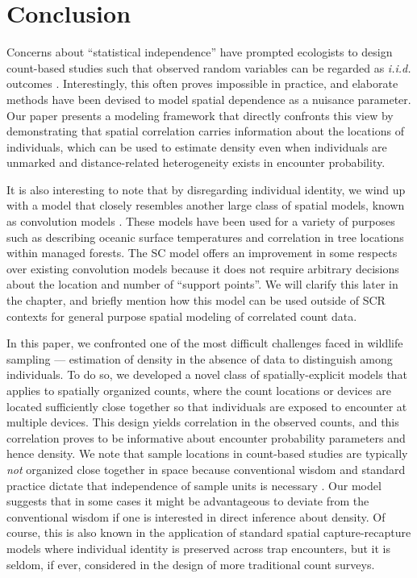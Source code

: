 \section{Conclusion}

Concerns about ``statistical independence'' have prompted
ecologists to design count-based studies such that observed
random variables can be regarded as {\it i.i.d.} outcomes
\citep{hurlbert:1984}. Interestingly, this
often proves impossible in practice, and elaborate
methods have been devised to model spatial dependence as a nuisance
parameter. Our paper presents a modeling framework that directly
confronts this view by demonstrating that spatial
correlation carries information about the locations of individuals,
which can be used to estimate density even when individuals
are unmarked and distance-related heterogeneity exists in encounter
probability.




It is also interesting to note that by disregarding individual
identity, we wind up with a model that closely resembles another large
class of spatial models, known as convolution models
\citep{wolpert_ickstadt:1998,higdon:1998}. These
models have been used for a variety of purposes such as describing oceanic
surface temperatures and correlation in tree locations within managed
forests. The SC model offers an improvement in
some respects over existing convolution models because it does not
require arbitrary decisions about the location and number of ``support
points''. We will clarify this later in the chapter, and briefly
mention how this model can be used outside of SCR contexts for general
purpose spatial modeling of correlated count data.


In this paper, we confronted one of the most difficult challenges
faced in wildlife sampling ---
estimation of density in the absence of data to distinguish among
individuals. To do so, we developed a novel class of
spatially-explicit models that
applies to spatially organized counts, where the count locations or
devices are located sufficiently close together so that individuals
are exposed to encounter at multiple devices. This design yields
correlation in the observed counts, and this correlation proves to be
informative about encounter probability parameters and hence density.
We note that sample locations in count-based studies are typically
{\it not} organized close
together in space because conventional wisdom and standard practice
dictate that independence of sample units is necessary
\citep{hurlbert:1984}. Our model
suggests that in some cases it might be advantageous to deviate from
the conventional wisdom if one is interested in direct inference about
density. Of course, this is also known in the application of standard spatial
capture-recapture  models \citep{borchers_efford:2008}
where individual
identity is preserved across trap encounters, but it is seldom, if
ever, considered in the design of more traditional count surveys.

